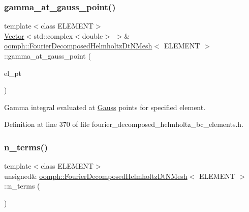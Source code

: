 \subsubsection{\texorpdfstring{gamma\+\_\+at\+\_\+gauss\+\_\+point()}{gamma\_at\_gauss\_point()}}
{\footnotesize\ttfamily template$<$class E\+L\+E\+M\+E\+NT$>$ \\
\hyperlink{classoomph_1_1Vector}{Vector}$<$std\+::complex$<$double$>$ $>$\& \hyperlink{classoomph_1_1FourierDecomposedHelmholtzDtNMesh}{oomph\+::\+Fourier\+Decomposed\+Helmholtz\+Dt\+N\+Mesh}$<$ E\+L\+E\+M\+E\+NT $>$\+::gamma\+\_\+at\+\_\+gauss\+\_\+point (\begin{DoxyParamCaption}\item[{\hyperlink{classoomph_1_1FiniteElement}{Finite\+Element} $\ast$}]{el\+\_\+pt }\end{DoxyParamCaption})\hspace{0.3cm}{\ttfamily [inline]}}



Gamma integral evaluated at \hyperlink{classoomph_1_1Gauss}{Gauss} points for specified element. 



Definition at line 370 of file fourier\+\_\+decomposed\+\_\+helmholtz\+\_\+bc\+\_\+elements.\+h.

\mbox{\label{classoomph_1_1FourierDecomposedHelmholtzDtNMesh_aef11b1201fcfcc7e1bc868920d803a56}} 
\subsubsection{\texorpdfstring{n\+\_\+terms()}{n\_terms()}}
{\footnotesize\ttfamily template$<$class E\+L\+E\+M\+E\+NT$>$ \\
unsigned\& \hyperlink{classoomph_1_1FourierDecomposedHelmholtzDtNMesh}{oomph\+::\+Fourier\+Decomposed\+Helmholtz\+Dt\+N\+Mesh}$<$ E\+L\+E\+M\+E\+NT $>$\+::n\+\_\+terms (\begin{DoxyParamCaption}{ }\end{DoxyParamCaption})\hspace{0.3cm}{\ttfamily [inline]}}



